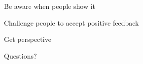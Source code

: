 \documentclass[aspectratio=169]{beamer}
\begin{document}
\begin{frame}
  \begin{center}
    \Huge Be aware when people show it
  \end{center}
\end{frame}

\begin{frame}
  \begin{center}
    \Huge Challenge people to accept positive feedback
  \end{center}
\end{frame}

\begin{frame}
  \begin{center}
    \Huge Get perspective
  \end{center}
\end{frame}

\begin{frame}
  \begin{center}
    \Huge Questions?
  \end{center}
\end{frame}

\begin{frame}
 

  
\end{frame}
\end{document}
